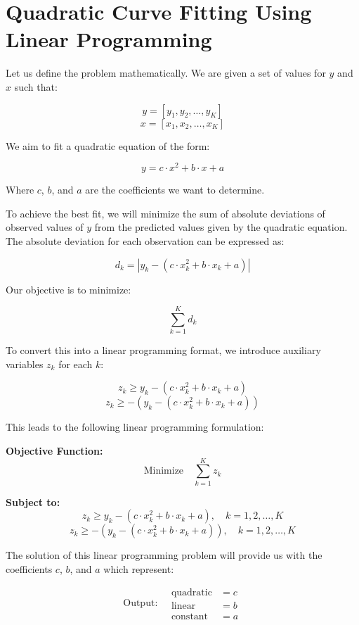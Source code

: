 \documentclass{article}
\begin{document}
\section*{Quadratic Curve Fitting Using Linear Programming}

Let us define the problem mathematically. We are given a set of values for \( y \) and \( x \) such that:

\[
y = [y_1, y_2, \ldots, y_K]
\]
\[
x = [x_1, x_2, \ldots, x_K]
\]

We aim to fit a quadratic equation of the form:

\[
y = c \cdot x^2 + b \cdot x + a
\]

Where \( c \), \( b \), and \( a \) are the coefficients we want to determine.

To achieve the best fit, we will minimize the sum of absolute deviations of observed values of \( y \) from the predicted values given by the quadratic equation. The absolute deviation for each observation can be expressed as:

\[
d_k = |y_k - (c \cdot x_k^2 + b \cdot x_k + a)|
\]

Our objective is to minimize:

\[
\sum_{k=1}^{K} d_k
\]

To convert this into a linear programming format, we introduce auxiliary variables \( z_k \) for each \( k \):

\[
z_k \geq y_k - (c \cdot x_k^2 + b \cdot x_k + a)
\]
\[
z_k \geq -(y_k - (c \cdot x_k^2 + b \cdot x_k + a))
\]

This leads to the following linear programming formulation:

\textbf{Objective Function:}
\[
\text{Minimize} \quad \sum_{k=1}^{K} z_k
\]

\textbf{Subject to:}
\[
z_k \geq y_k - (c \cdot x_k^2 + b \cdot x_k + a), \quad k = 1, 2, \ldots, K
\]
\[
z_k \geq -(y_k - (c \cdot x_k^2 + b \cdot x_k + a)), \quad k = 1, 2, \ldots, K
\]

The solution of this linear programming problem will provide us with the coefficients \( c \), \( b \), and \( a \) which represent:

\[
\text{Output:} \quad
\begin{align*}
\text{quadratic} & = c \\
\text{linear} & = b \\
\text{constant} & = a
\end{align*}
\]
\end{document}
